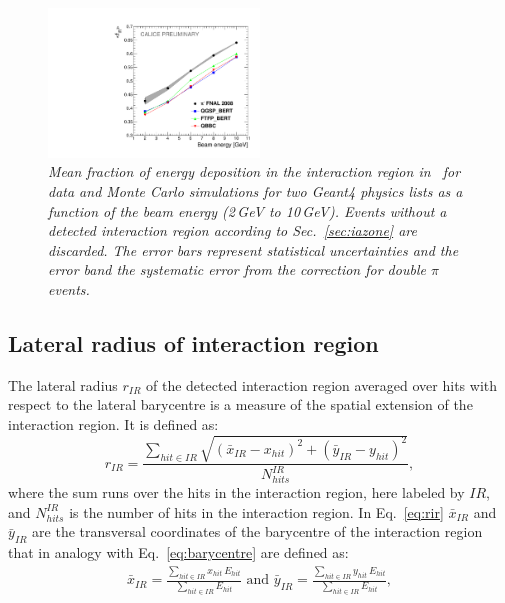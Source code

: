 \begin{figure}[H]
	\centering
	\includegraphics[width=0.5\textwidth]{ECAL/plots/e-ir-graph.pdf}
	\caption{\label{fig:irgraph} \sl  Mean fraction of energy deposition in the interaction region in \ecal\ for data and  Monte Carlo simulations for two {\sc Geant}4 physics lists as a function of the beam energy (2\,GeV to 10\,GeV). Events without a detected interaction region according to Sec.~\ref{sec:iazone} are discarded. The error bars represent statistical uncertainties and the error band the systematic error from the correction for double $\pi$ events.}
\end{figure}
\subsection{Lateral radius of interaction region}
The lateral radius $r_{IR}$  of the detected interaction region averaged over hits with respect to the lateral barycentre is a measure of the spatial extension of the interaction region. 
It is defined as:
\begin{equation}
r_{IR} = \frac{\displaystyle \sum_{hit \in IR} \sqrt{(\bar{x}_{IR} - x_{hit})^2 + (\bar{y}_{IR} - y_{hit})^2}} {\displaystyle N_{hits}^{IR}},
\label{eq:rir}
\end{equation}
where the sum runs over the hits in the interaction region, here labeled by $IR$, and $N_{hits}^{IR}$ is the number of hits in the interaction region. In Eq.~\ref{eq:rir} $\bar{x}_{IR}$ and $\bar{y}_{IR}$ are the transversal coordinates of the barycentre of the interaction region that in analogy with Eq.~\ref{eq:barycentre} are defined as: 
\begin{eqnarray}
\label{eq:barycentre2}
\bar{x}_{IR} = \frac{\displaystyle \sum_{hit \in IR} x_{hit}\,E_{hit}}{\displaystyle \sum_{hit \in IR} E_{hit}} 
\text{ and }
\bar{y}_{IR} = \frac{\displaystyle \sum_{hit \in IR} y_{hit}\,E_{hit}}{\displaystyle \sum_{hit \in IR} E_{hit}},
\end{eqnarray}

